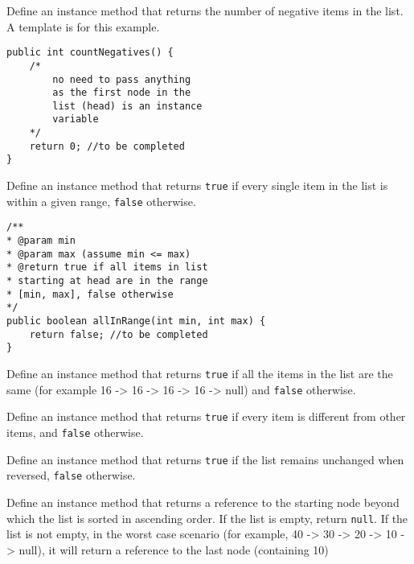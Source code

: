 \begin{questions}
\question Define an instance method that returns the number of negative items in the list. A template is for this example.

\begin{lstlisting}
public int countNegatives() {
	/* 
		no need to pass anything
		as the first node in the 
		list (head) is an instance
		variable
	*/
	return 0; //to be completed
}
\end{lstlisting}

\question Define an instance method that returns \texttt{true} if every single item in the list is within a given range, \texttt{false} otherwise.

\begin{lstlisting}
/**
* @param min
* @param max (assume min <= max)
* @return true if all items in list
* starting at head are in the range
* [min, max], false otherwise
*/
public boolean allInRange(int min, int max) {
	return false; //to be completed
}
\end{lstlisting}

\question Define an instance method that returns \texttt{true} if all the items in the list are the same (for example 16 -> 16 -> 16 -> 16 -> null) and \texttt{false} otherwise.

\question Define an instance method that returns \texttt{true} if every item is different from other items, and \texttt{false} otherwise.

\question Define an instance method that returns \texttt{true} if the list remains unchanged when reversed, \texttt{false} otherwise.

\question Define an instance method that returns a reference to the starting node beyond which the list is sorted in ascending order. If the list is empty, return \texttt{null}. If the list is not empty, in the worst case scenario (for example, 40 -> 30 -> 20 -> 10 -> null), it will return a reference to the last node (containing 10)
\end{questions}


